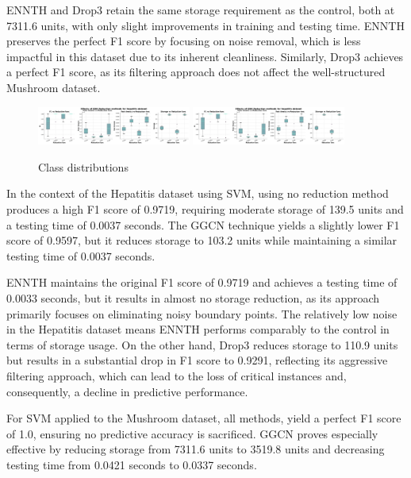 ENNTH and Drop3 retain the same storage requirement as the control, both at 7311.6 units, with only slight improvements in training and testing time. 
ENNTH preserves the perfect F1 score by focusing on noise removal, which is less impactful in this dataset due to its inherent cleanliness. 
Similarly, Drop3 achieves a perfect F1 score, as its filtering approach does not affect the well-structured Mushroom dataset.

\begin{figure}
    \centering
    \includegraphics[width=0.45\textwidth]{figures/KNN_reduction_effects_hepatitis.png}
    \includegraphics[width=0.45\textwidth]{figures/KNN_reduction_effects_hepatitis.png}
    \caption{Class distributions}
    \label{fig:KNN-reduction-effects}
\end{figure}

In the context of the Hepatitis dataset using SVM, using no reduction method produces a high F1 score of 0.9719, requiring moderate storage of 139.5 units and a testing time of 0.0037 seconds.
The GGCN technique yields a slightly lower F1 score of 0.9597, but it reduces storage to 103.2 units while maintaining a similar testing time of 0.0037 seconds.

ENNTH maintains the original F1 score of 0.9719 and achieves a testing time of 0.0033 seconds, but it results in almost no storage reduction, as its approach primarily focuses on eliminating noisy boundary points. 
The relatively low noise in the Hepatitis dataset means ENNTH performs comparably to the control in terms of storage usage.
On the other hand, Drop3 reduces storage to 110.9 units but results in a substantial drop in F1 score to 0.9291, reflecting its aggressive filtering approach, which can lead to the loss of critical instances and, consequently, a decline in predictive performance.

For SVM applied to the Mushroom dataset, all methods, yield a perfect F1 score of 1.0, ensuring no predictive accuracy is sacrificed. 
GGCN proves especially effective by reducing storage from 7311.6 units to 3519.8 units and decreasing testing time from 0.0421 seconds to 0.0337 seconds.


